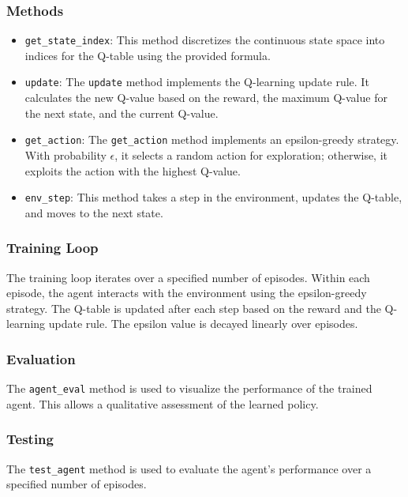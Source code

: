 \documentclass{article}
\begin{document}
\subsubsection{Methods}
\begin{itemize}
    \item \texttt{get\_state\_index}: This method discretizes the continuous state space into indices for the Q-table using 
    the provided formula.
    \item \texttt{update}: The \texttt{update} method implements the Q-learning update rule. It calculates the new Q-value 
    based on the reward, the maximum Q-value for the next state, and the current Q-value.
    \item \texttt{get\_action}: The \texttt{get\_action} method implements an epsilon-greedy strategy. With probability 
    \(\epsilon\), it selects a random action for exploration; otherwise, it exploits the action with the highest Q-value.
    \item \texttt{env\_step}: This method takes a step in the environment, updates the Q-table, and moves to the next state.
\end{itemize}

\subsubsection{Training Loop}
The training loop iterates over a specified number of episodes. Within each episode, the agent interacts with the environment 
using the epsilon-greedy strategy. The Q-table is updated after each step based on the reward and the Q-learning update rule. 
The epsilon value is decayed linearly over episodes.

\subsubsection{Evaluation}
The \texttt{agent\_eval} method is used to visualize the performance of the trained agent. This allows a qualitative 
assessment of the learned policy.

\subsubsection{Testing}
The \texttt{test\_agent} method is used to evaluate the agent's performance over a specified number of episodes.

\end{document}
